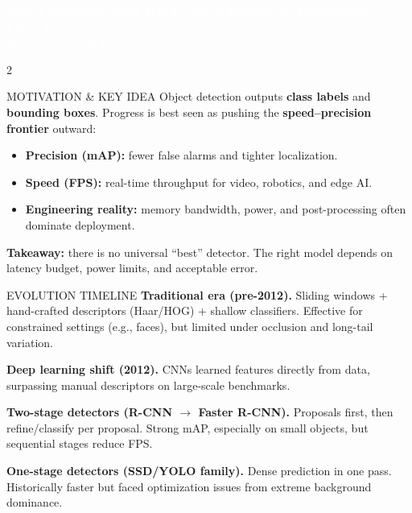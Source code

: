 \documentclass[10pt]{article}
\begin{document}
\begin{headerbox}
  \begin{center}
    {\LARGE\bfseries\textcolor{white}{Object Detection: From Hand-Crafted Features to Transformers}}\\[2mm]
    {\normalsize\textcolor{white}{Kumar Prateek}}\\[1mm]
    {\small\textcolor{white}{Indian Institute of Information Technology, Allahabad}}
  \end{center}
\end{headerbox}

\begin{multicols}{2}

\begin{sectionbox}{MOTIVATION \& KEY IDEA}
\small
Object detection outputs \textbf{class labels} and \textbf{bounding boxes}. Progress is best seen as pushing the \textbf{speed--precision frontier} outward:
\begin{itemize}
\item \textbf{Precision (mAP):} fewer false alarms and tighter localization.
\item \textbf{Speed (FPS):} real-time throughput for video, robotics, and edge AI.
\item \textbf{Engineering reality:} memory bandwidth, power, and post-processing often dominate deployment.
\end{itemize}
\textbf{Takeaway:} there is no universal ``best'' detector. The right model depends on latency budget, power limits, and acceptable error.
\end{sectionbox}

\begin{sectionbox}{EVOLUTION TIMELINE}
\small
\textbf{Traditional era (pre-2012).} Sliding windows + hand-crafted descriptors (Haar/HOG) + shallow classifiers. Effective for constrained settings (e.g., faces), but limited under occlusion and long-tail variation.

\textbf{Deep learning shift (2012).} CNNs learned features directly from data, surpassing manual descriptors on large-scale benchmarks.

\textbf{Two-stage detectors (R-CNN $\rightarrow$ Faster R-CNN).}
Proposals first, then refine/classify per proposal. Strong mAP, especially on small objects, but sequential stages reduce FPS.

\textbf{One-stage detectors (SSD/YOLO family).}
Dense prediction in one pass. Historically faster but faced optimization issues from extreme background dominance.


\end{sectionbox}
\end{multicols}
\end{document}
